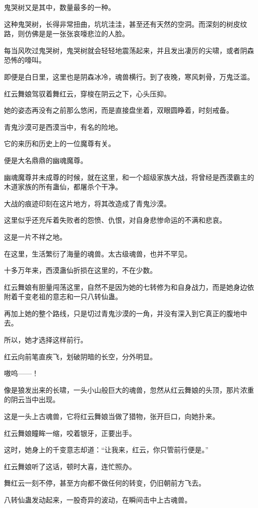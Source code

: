 \begin{this_body}
鬼哭树又是其中，数量最多的一种。

这种鬼哭树，长得非常扭曲，坑坑洼洼，甚至还有天然的空洞。而深刻的树皮纹路，则仿佛是是一张张哀嚎悲泣的人脸。

每当风吹过鬼哭树，鬼哭树就会轻轻地震荡起来，并且发出凄厉的尖啸，或者阴森恐怖的嚎叫。

即便是白日里，这里也是阴森冰冷，魂兽横行。到了夜晚，寒风刺骨，万鬼泛滥。

红云舞娘驾驭着舞红云，穿梭在阴云之下，心头压抑。

她的姿态再没有之前那么悠闲，而是直接盘坐着，双眼圆睁着，时刻戒备。

青鬼沙漠可是西漠当中，有名的险地。

它的来历和历史上的一位魔尊有关。

便是大名鼎鼎的幽魂魔尊。

幽魂魔尊并未成尊的时候，就在这里，和一个超级家族大战，将曾经是西漠霸主的木道家族的所有蛊仙，都屠杀个干净。

大战的痕迹印刻在这片地方，将其改造成了青鬼沙漠。

这里似乎还充斥着失败者的怨愤、仇恨，对自身悲惨命运的不满和悲哀。

这是一片不祥之地。

在这里，生活繁衍了海量的魂兽。太古级魂兽，也并不罕见。

十多万年来，西漠蛊仙折损在这里的，不在少数。

红云舞娘有胆量闯荡这里，自然不是因为她的七转修为和自身战力，而是她身边依附着千变老祖的意志和一只八转仙蛊。

再加上她的整个路线，只是切过青鬼沙漠的一角，并没有深入到它真正的腹地中去。

所以，她才选择这样前行。

红云向前笔直疾飞，划破阴暗的长空，分外明显。

嗷呜——！

像是狼发出来的长啸，一头小山般巨大的魂兽，忽然从红云舞娘的头顶，那片浓重的阴云当中出现。

这是一头上古魂兽，它将红云舞娘当做了猎物，张开巨口，向她扑来。

红云舞娘瞳眸一缩，咬着银牙，正要出手。

这时，她身上的千变意志却道：“让我来，红云，你只管前行便是。”

红云舞娘听了这话，顿时大喜，连忙照办。

舞红云一刻不停，甚至方向都不做任何的转变，仍旧朝前方飞去。

八转仙蛊发动起来，一股奇异的波动，在瞬间击中上古魂兽。


\end{this_body}
